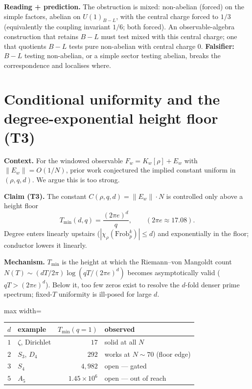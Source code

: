 \documentclass[11pt]{article}
\begin{document}
\textbf{Reading + prediction.} The obstruction is mixed: non-abelian (forced) on the simple factors, abelian on $U(1)_{B-L}$, with the central charge forced to $1/3$ (equivalently the coupling invariant $1/6$; both forced). An observable-algebra construction that retains $B\!-\!L$ must test mixed with this central charge; one that quotients $B\!-\!L$ tests pure non-abelian with central charge $0$. \textbf{Falsifier:} $B\!-\!L$ testing non-abelian, or a simple sector testing abelian, breaks the correspondence and localises where.

\section{Conditional uniformity and the degree-exponential height floor (T3)}

\textbf{Context.} For the windowed observable $F_w=K_w[\rho]+E_w$ with $\|E_w\|=O(1/N)$, prior work conjectured the implied constant uniform in $(\rho,q,d)$. We argue this is too strong.

\textbf{Claim (T3).} The constant $C(\rho,q,d)=\|E_w\|\cdot N$ is controlled only above a height floor
\[
T_{\min}(d,q)=\frac{(2\pi e)^d}{q},\qquad (2\pi e\approx17.08).
\]
Degree enters linearly upstairs ($|\chi_\rho(\mathrm{Frob}_p^k)|\le d$) and exponentially in the floor; conductor lowers it linearly.

\textbf{Mechanism.} $T_{\min}$ is the height at which the Riemann--von Mangoldt count $N(T)\sim(dT/2\pi)\log(qT/(2\pi e)^d)$ becomes asymptotically valid ($qT>(2\pi e)^d$). Below it, too few zeros exist to resolve the $d$-fold denser prime spectrum; fixed-$T$ uniformity is ill-posed for large $d$.

\begin{center}
\begin{adjustbox}{max width=\linewidth}\begin{tabular}{clrl}
\toprule
$d$ & example & $T_{\min}(q{=}1)$ & observed \\
\midrule
$1$ & $\zeta$, Dirichlet & $17$ & solid at all $N$ \\
$2$ & $S_3$, $D_4$ & $292$ & works at $N\sim70$ (floor edge) \\
$3$ & $S_4$ & $4{,}982$ & open --- gated \\
$5$ & $A_5$ & $1.45\times10^6$ & open --- out of reach \\
\bottomrule
\end{tabular}\end{adjustbox}
\end{center}
\end{document}
